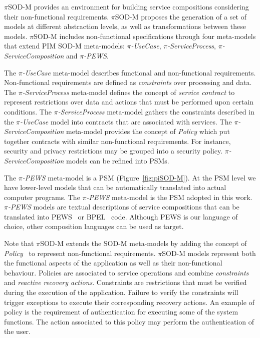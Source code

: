 $\pi$SOD-M provides an environment for building service compositions considering
their non-functional requirements. $\pi$SOD-M proposes the generation of a set of models at different abstraction levels, as well as transformations between these models.
$\pi$SOD-M includes non-functional specifications through
 four meta-models that extend PIM SOD-M meta-models: \textit{$\pi$-UseCase}, \textit{$\pi$-ServiceProcess}, \textit{$\pi$-ServiceCom\-po\-si\-tion} and \textit{$\pi$-PEWS}.


The \textit{$\pi$-UseCase} meta-model describes functional and non-functional requirements.
Non-functional requirements are defined as \textit{constraints} over processing and data. 
The \textit{$\pi$-ServiceProcess} meta-model defines the concept of \textit{service contract} to represent restrictions over data and actions that must be performed upon certain conditions. 
The \textit{$\pi$-ServiceProcess} meta-model gathers the constraints
described in the \textit{$\pi$-UseCase} model into contracts that are associated
with services. 
The \textit{$\pi$-ServiceComposition} meta-model provides the concept of \textit{Policy}
which put together contracts with similar non-functional requirements. 
For instance, security and privacy restrictions may be grouped into a security policy.
\textit{$\pi$-ServiceComposition} models can be refined into PSMs.

The \textit{$\pi$-PEWS} meta-model is a PSM (Figure~\ref{fig:piSOD-M}).
At the PSM level we have lower-level models that can be automatically translated into actual computer programs.
The \textit{$\pi$-PEWS} meta-model is the PSM adopted in this work.
\textit{$\pi$-PEWS} models are textual descriptions of service compositions that can be translated into PEWS~\cite{BaCAM05,Placido2010LTPD} or BPEL~\cite{bpel03} code.
Although PEWS is our language of choice, other composition languages can be used as target.


Note that $\pi$SOD-M extends the SOD-M meta-models by adding
the concept of \textit{Policy}~\cite{Espinosa-Oviedo2011a}
to represent non-functional requirements. $\pi$SOD-M models represent both the functional aspects of the application as well as their non-functional behaviour. 
Policies are associated to service operations and combine \textit{constraints} and \textit{reactive recovery actions}.
Constraints are restrictions that must be verified during the execution of the application. 
Failure to verify the constraints will trigger exceptions to execute their corresponding recovery actions.
An example of policy is the requirement of authentication for executing some of the system functions. 
The action associated to this policy may perform the authentication of the user.

